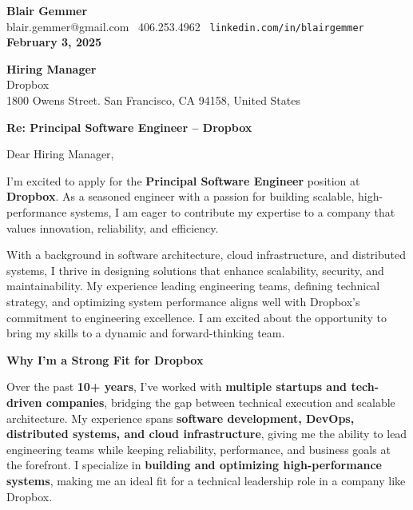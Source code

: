 \documentclass[a4paper,10.5pt]{article}
\makeatletter
\newcommand{\applicantName}{Blair Gemmer}
\newcommand{\applicantEmail}{blair.gemmer@gmail.com }
\newcommand{\applicantPhone}{406.253.4962 }
\newcommand{\linkedinURL}{\texttt{linkedin.com/in/blairgemmer}}
\newcommand{\applicationDate}{February 3, 2025}
\newcommand{\companyName}{Dropbox}
\newcommand{\hiringManager}{Hiring Manager}
\newcommand{\companyAddress}{1800 Owens Street. San Francisco, CA 94158, United States}
\newcommand{\jobTitle}{Principal Software Engineer}
\makeatother
\begin{document}
\begin{flushleft}
\textbf{\large \applicantName} \\
\applicantEmail \textbar\ \applicantPhone \textbar\ \linkedinURL \\
\textbf{\applicationDate}  
\end{flushleft}

\begin{flushleft}
\textbf{\hiringManager} \\
\companyName \\  
\companyAddress  
\end{flushleft}

\vspace{0.5cm}

\noindent
\textbf{Re: \jobTitle{} -- \companyName{}}

\vspace{0.5cm}

\noindent
Dear \hiringManager,

\vspace{0.5cm}

I’m excited to apply for the \textbf{\jobTitle} position at \textbf{\companyName}. As a seasoned engineer with a passion for building scalable, high-performance systems, I am eager to contribute my expertise to a company that values innovation, reliability, and efficiency. 

With a background in software architecture, cloud infrastructure, and distributed systems, I thrive in designing solutions that enhance scalability, security, and maintainability. My experience leading engineering teams, defining technical strategy, and optimizing system performance aligns well with \companyName’s commitment to engineering excellence. I am excited about the opportunity to bring my skills to a dynamic and forward-thinking team.


\vspace{0.5cm}

\noindent
\textbf{Why I’m a Strong Fit for \companyName}

Over the past \textbf{10+ years}, I’ve worked with \textbf{multiple startups and tech-driven companies}, bridging the gap between technical execution and scalable architecture. My experience spans \textbf{software development, DevOps, distributed systems, and cloud infrastructure}, giving me the ability to lead engineering teams while keeping reliability, performance, and business goals at the forefront. I specialize in \textbf{building and optimizing high-performance systems}, making me an ideal fit for a technical leadership role in a company like \companyName.
\end{document}
